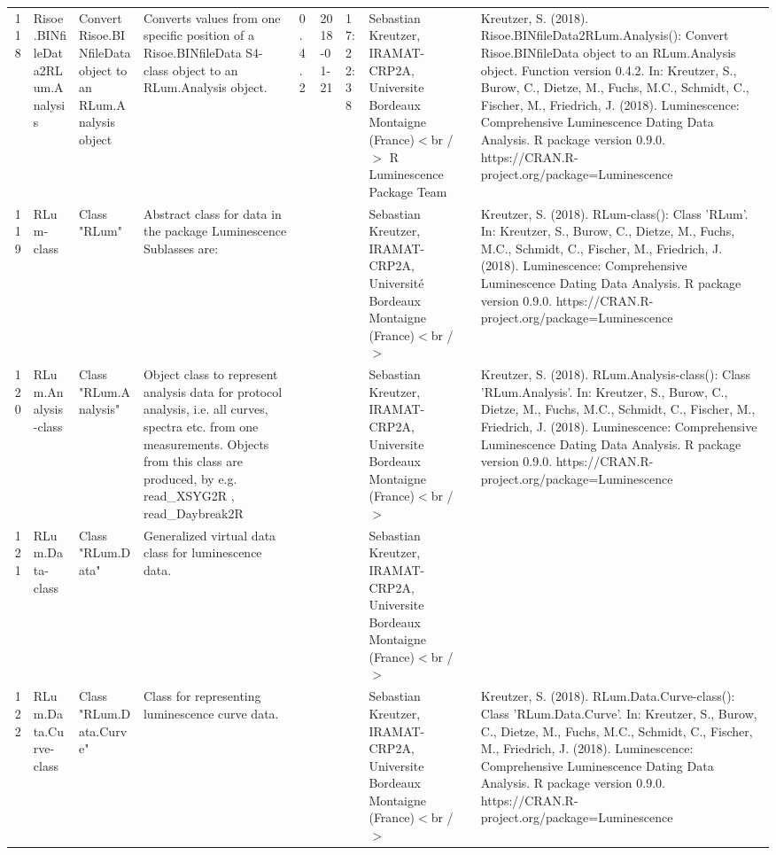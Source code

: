 \begin{table}[ht]
\begin{tabular}{rllllllll}
 \\ 
  118 & Risoe.BINfileData2RLum.Analysis & Convert Risoe.BINfileData object to an RLum.Analysis object & Converts values from one specific position of a Risoe.BINfileData S4-class object to an RLum.Analysis object. & 0.4.2 & 2018-01-21 & 17:22:38
 & Sebastian Kreutzer, IRAMAT-CRP2A, Universite Bordeaux Montaigne (France)$<$br /$>$  R Luminescence Package Team & Kreutzer, S. (2018). Risoe.BINfileData2RLum.Analysis(): Convert Risoe.BINfileData object to an RLum.Analysis object. Function version 0.4.2. In: Kreutzer, S., Burow, C., Dietze, M., Fuchs, M.C., Schmidt, C., Fischer, M., Friedrich, J. (2018). Luminescence: Comprehensive Luminescence Dating Data Analysis. R package version 0.9.0. https://CRAN.R-project.org/package=Luminescence
 \\ 
  119 & RLum-class & Class  "RLum" & Abstract class for data in the package Luminescence Sublasses are: &  &  &  & Sebastian Kreutzer, IRAMAT-CRP2A, Université Bordeaux Montaigne (France)$<$br /$>$ & Kreutzer, S. (2018). RLum-class(): Class 'RLum'. In: Kreutzer, S., Burow, C., Dietze, M., Fuchs, M.C., Schmidt, C., Fischer, M., Friedrich, J. (2018). Luminescence: Comprehensive Luminescence Dating Data Analysis. R package version 0.9.0. https://CRAN.R-project.org/package=Luminescence
 \\ 
  120 & RLum.Analysis-class & Class  "RLum.Analysis" & Object class to represent analysis data for protocol analysis, i.e. all curves, spectra etc. from one measurements. Objects from this class are produced, by e.g.  read\_XSYG2R ,  read\_Daybreak2R &  &  &  & Sebastian Kreutzer, IRAMAT-CRP2A, Universite Bordeaux Montaigne (France)$<$br /$>$ & Kreutzer, S. (2018). RLum.Analysis-class(): Class 'RLum.Analysis'. In: Kreutzer, S., Burow, C., Dietze, M., Fuchs, M.C., Schmidt, C., Fischer, M., Friedrich, J. (2018). Luminescence: Comprehensive Luminescence Dating Data Analysis. R package version 0.9.0. https://CRAN.R-project.org/package=Luminescence
 \\ 
  121 & RLum.Data-class & Class  "RLum.Data" & Generalized virtual data class for luminescence data. &  &  &  & Sebastian Kreutzer, IRAMAT-CRP2A, Universite Bordeaux Montaigne (France)$<$br /$>$ &  \\ 
  122 & RLum.Data.Curve-class & Class  "RLum.Data.Curve" & Class for representing luminescence curve data. &  &  &  & Sebastian Kreutzer, IRAMAT-CRP2A, Universite Bordeaux Montaigne (France)$<$br /$>$ & Kreutzer, S. (2018). RLum.Data.Curve-class(): Class 'RLum.Data.Curve'. In: Kreutzer, S., Burow, C., Dietze, M., Fuchs, M.C., Schmidt, C., Fischer, M., Friedrich, J. (2018). Luminescence: Comprehensive Luminescence Dating Data Analysis. R package version 0.9.0. https://CRAN.R-project.org/package=Luminescence

\end{tabular}
\end{table}
